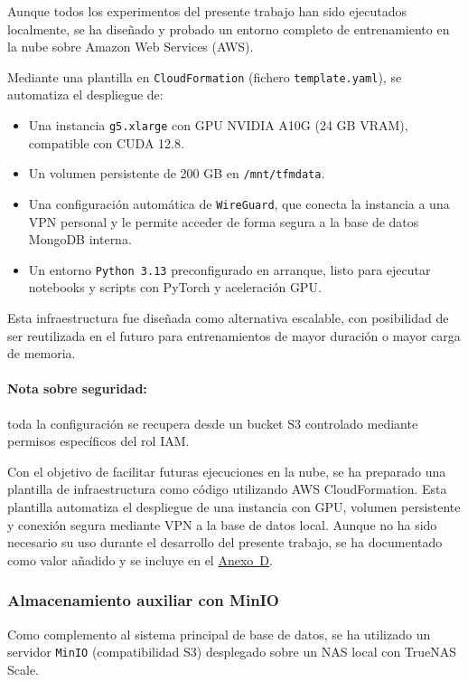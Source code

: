 Aunque todos los experimentos del presente trabajo han sido ejecutados localmente, se ha diseñado y probado un entorno completo de entrenamiento en la nube sobre Amazon Web Services (AWS).

Mediante una plantilla en \texttt{CloudFormation} (fichero \texttt{template.yaml}), se automatiza el despliegue de:

\begin{itemize}
	\item Una instancia \texttt{g5.xlarge} con GPU NVIDIA A10G (24 GB VRAM), compatible con CUDA 12.8.
	\item Un volumen persistente de 200 GB en \texttt{/mnt/tfmdata}.
	\item Una configuración automática de \texttt{WireGuard}, que conecta la instancia a una VPN personal y le permite acceder de forma segura a la base de datos MongoDB interna.
	\item Un entorno \texttt{Python 3.13} preconfigurado en arranque, listo para ejecutar notebooks y scripts con PyTorch y aceleración GPU.
\end{itemize}

Esta infraestructura fue diseñada como alternativa escalable, con posibilidad de ser reutilizada en el futuro para entrenamientos de mayor duración o mayor carga de memoria.

\paragraph{Nota sobre seguridad:} toda la configuración se recupera desde un bucket S3 controlado mediante permisos específicos del rol IAM.

Con el objetivo de facilitar futuras ejecuciones en la nube, se ha preparado una plantilla de infraestructura como código utilizando AWS CloudFormation. Esta plantilla automatiza el despliegue de una instancia con GPU, volumen persistente y conexión segura mediante VPN a la base de datos local. Aunque no ha sido necesario su uso durante el desarrollo del presente trabajo, se ha documentado como valor añadido y se incluye en el \hyperref[anexo:plantilla_aws]{Anexo~D}.

\subsubsection*{Almacenamiento auxiliar con MinIO}

Como complemento al sistema principal de base de datos, se ha utilizado un servidor \texttt{MinIO} (compatibilidad S3) desplegado sobre un NAS local con TrueNAS Scale.

